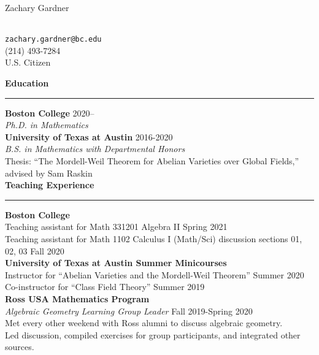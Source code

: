 \documentclass[11pt]{article}
\newenvironment{mysection}{
\color{mygreen}\bfseries\large
}
{
\\ \rule{\textwidth}{1pt}\hspace{-.25em}
} %
\begin{document}
\begin{center}
\begin{LARGE}Zachary Gardner\end{LARGE} \\
\vspace{1em}
\texttt{zachary.gardner@bc.edu} \\
(214) 493-7284 \\
U.S. Citizen \\
\end{center}

\begin{mysection}Education\end{mysection}
\textbf{Boston College} \hfill 2020-- \\
\textit{Ph.D. in Mathematics} \\

\textbf{University of Texas at Austin} \hfill 2016-2020 \\
\textit{B.S. in Mathematics with Departmental Honors} \\
Thesis: ``The Mordell-Weil Theorem for Abelian Varieties over Global Fields,'' advised by Sam Raskin \\

\begin{mysection}Teaching Experience\end{mysection}
\textbf{Boston College} \\
Teaching assistant for Math 331201 Algebra II \hfill Spring 2021 \\
Teaching assistant for Math 1102 Calculus I (Math/Sci) discussion sections 01, 02, 03 \hfill Fall 2020 \\

\textbf{University of Texas at Austin Summer Minicourses} \\
Instructor for ``Abelian Varieties and the Mordell-Weil Theorem'' \hfill Summer 2020 \\
Co-instructor for ``Class Field Theory'' \hfill Summer 2019 \\

\textbf{Ross USA Mathematics Program} \\
\textit{Algebraic Geometry Learning Group Leader} \hfill Fall 2019-Spring 2020 \\
Met every other weekend with Ross alumni to discuss algebraic geometry. \\
Led discussion, compiled exercises for group participants, and integrated other sources. \\
\end{document}
